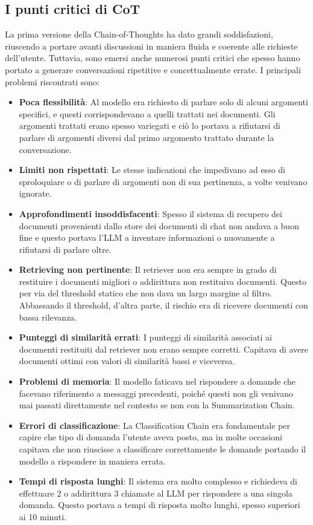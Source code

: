 \subsection{I punti critici di CoT}
La prima versione della Chain-of-Thoughts ha dato grandi soddisfazioni, riuscendo a portare avanti discussioni in maniera fluida e coerente alle richieste dell'utente. Tuttavia, sono emersi anche numerosi punti critici che spesso hanno portato a generare conversazioni ripetitive e concettualmente errate. I principali problemi riscontrati sono:
\begin{itemize}
    \item \textbf{Poca flessibilità}: Al modello era richiesto di parlare solo di alcuni argomenti specifici, e questi corrispondevano a quelli trattati nei documenti. Gli argomenti trattati erano spesso variegati e ciò lo portava a rifiutarsi di parlare di argomenti diversi dal primo argomento trattato durante la conversazione.
    \item \textbf{Limiti non rispettati}: Le stesse indicazioni che impedivano ad esso di sproloquiare o di parlare di argomenti non di sua pertinenza, a volte venivano ignorate.
    \item \textbf{Approfondimenti insoddisfacenti}: Spesso il sistema di recupero dei documenti provenienti dallo store dei documenti di chat non andava a buon fine e questo portava l'LLM a inventare informazioni o nuovamente a rifiutarsi di parlare oltre.
    \item \textbf{Retrieving non pertinente}: Il retriever non era sempre in grado di restituire i documenti migliori o addirittura non restituiva documenti. Questo per via del threshold statico che non dava un largo margine al filtro. Abbassando il threshold, d'altra parte, il rischio era di ricevere documenti con bassa rilevanza.
    \item \textbf{Punteggi di similarità errati}: I punteggi di similarità associati ai documenti restituiti dal retriever non erano sempre corretti. Capitava di avere documenti ottimi con valori di similarità bassi e viceversa.
    \item \textbf{Problemi di memoria}: Il modello faticava nel rispondere a domande che facevano riferimento a messaggi precedenti, poiché questi non gli venivano mai passati direttamente nel contesto se non con la Summarization Chain.
    \item \textbf{Errori di classificazione}: La Classification Chain era fondamentale per capire che tipo di domanda l'utente aveva posto, ma in molte occasioni capitava che non riuscisse a classificare correttamente le domande portando il modello a rispondere in maniera errata.
    \item \textbf{Tempi di risposta lunghi}: Il sistema era molto complesso e richiedeva di effettuare 2 o addirittura 3 chiamate al LLM per rispondere a una singola domanda. Questo portava a tempi di risposta molto lunghi, spesso superiori ai 10 minuti.
\end{itemize}

